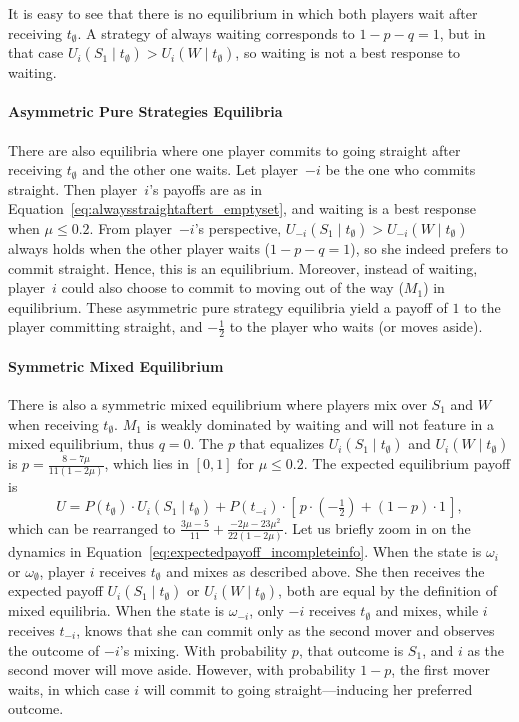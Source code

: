 \documentclass[../paper.tex]{subfiles}
\begin{document}
It is easy to see that there is no equilibrium in which both players wait after receiving $t_\emptyset$. A strategy of always waiting corresponds to $1-p-q=1$, but in that case $U_i(S_1 \mid t_\emptyset)> U_i(W \mid t_\emptyset)$, so waiting is not a best response to waiting.
\paragraph{Asymmetric Pure Strategies Equilibria}
There are also equilibria where one player commits to going straight after receiving $t_\emptyset$ and the other one waits. Let player~$-i$ be the one who commits straight. Then player~$i$'s payoffs are as in Equation~\ref{eq:alwaysstraightaftert_emptyset}, and waiting is a best response when $\mu \leq 0.2$. From player~$-i$'s perspective, $U_{-i}(S_1 \mid t_\emptyset) > U_{-i}(W \mid t_\emptyset)$ always holds when the other player waits ($1-p-q=1$), so she indeed prefers to commit straight. Hence, this is an equilibrium. Moreover, instead of waiting, player~$i$ could also choose to commit to moving out of the way ($M_1$) in equilibrium. These asymmetric pure strategy equilibria yield a payoff of $1$ to the player committing straight, and $-\tfrac{1}{2}$ to the player who waits (or moves aside).
\paragraph{Symmetric Mixed Equilibrium}
There is also a symmetric mixed equilibrium where players mix over $S_1$ and $W$ when receiving $t_\emptyset$. $M_1$ is weakly dominated by waiting and will not feature in a mixed equilibrium, thus $q=0$. The $p$ that equalizes $U_i(S_{1} \mid t_\emptyset)$ and $ U_i(W \mid t_\emptyset)$ is $p=\frac{8-7\mu}{11(1-2\mu)}$, which lies in $[0,1]$ for $\mu\leq0.2$. The expected equilibrium payoff is 
\begin{equation}
    U = P(t_\emptyset) \cdot U_i(S_1 \mid t_\emptyset)
      + P(t_{-i}) \cdot \left[\, p \cdot \left(-\tfrac{1}{2}\right) + (1 - p) \cdot 1 \,\right],
    \label{eq:expectedpayoff_incompleteinfo}
\end{equation}
which can be rearranged to $\frac{3\mu-5}{11}+\frac{-2\mu-23\mu^2}{22(1-2\mu)}$. Let us briefly zoom in on the dynamics in Equation~\ref{eq:expectedpayoff_incompleteinfo}. When the state is $\omega_i$ or $\omega_\emptyset$, player $i$ receives $t_\emptyset$ and mixes as described above. She then receives the expected payoff $U_i(S_1 \mid t_\emptyset)$ or $U_i(W \mid t_\emptyset)$, both are equal by the definition of mixed equilibria. 
When the state is $\omega_{-i}$, only $-i$ receives $t_\emptyset$ and mixes, while $i$ receives $t_{-i}$, knows that she can commit only as the second mover and observes the outcome of $-i$'s mixing. With probability $p$, that outcome is $S_1$, and $i$ as the second mover will move aside. However, with probability $1 - p$, the first mover waits, in which case $i$ will commit to going straight—inducing her preferred outcome.
\end{document}
